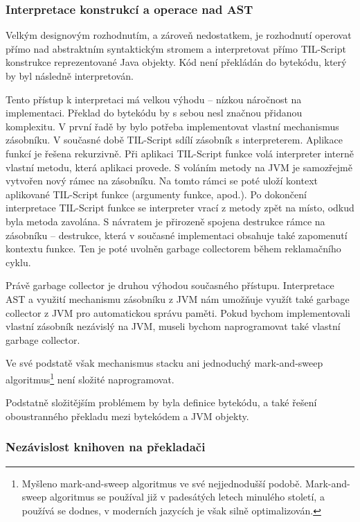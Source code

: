 \subsubsection{Interpretace konstrukcí a operace nad AST}

Velkým designovým rozhodnutím, a zároveň nedostatkem, je rozhodnutí operovat přímo nad abstraktním
syntaktickým stromem a interpretovat přímo TIL-Script konstrukce reprezentované Java objekty. Kód
není překládán do bytekódu, který by byl následně interpretován.

Tento přístup k interpretaci má velkou výhodu -- nízkou náročnost na implementaci. Překlad
do bytekódu by s sebou nesl značnou přidanou komplexitu. V první řadě by bylo potřeba implementovat
vlastní mechanismus zásobníku. V současné době TIL-Script sdílí zásobník s interpreterem. Aplikace
funkcí je řešena rekurzivně. Při aplikaci TIL-Script funkce volá interpreter interně vlastní metodu,
která aplikaci provede. S voláním metody na JVM je samozřejmě vytvořen nový rámec na zásobníku.
Na tomto rámci se poté uloží kontext aplikované TIL-Script funkce (argumenty funkce, apod.).
Po dokončení interpretace TIL-Script funkce se interpreter vrací z metody zpět na místo, odkud byla
metoda zavolána. S návratem je přirozeně spojena destrukce rámce na zásobníku -- destrukce, která
v současné implementaci obsahuje také zapomenutí kontextu funkce. Ten je poté uvolněn garbage
collectorem během reklamačního cyklu.

Právě garbage collector je druhou výhodou současného přístupu. Interpretace AST a využití mechanismu
zásobníku z JVM nám umožňuje využít také garbage collector z JVM pro automatickou správu paměti.
Pokud bychom implementovali vlastní zásobník nezávislý na JVM, museli bychom naprogramovat také
vlastní garbage collector.

Ve své podstatě však mechanismus stacku ani jednoduchý mark-and-sweep algoritmus\footnote{Myšleno
  mark-and-sweep algoritmus ve své nejjednodušší podobě. Mark-and-sweep algoritmus se používal již
  v padesátých letech minulého století, a používá se dodnes, v moderních jazycích je však silně
  optimalizován.} není složité naprogramovat.

Podstatně složitějším problémem by byla definice bytekódu, a také řešení oboustranného překladu mezi
bytekódem a JVM objekty.


\subsubsection{Nezávislost knihoven na překladači}

